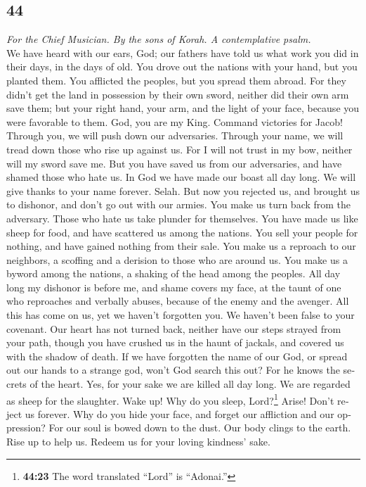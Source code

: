 \begin{paracol}{2}
\switchcolumn
\begin{otherlanguage}{english}

\hypertarget{section-87}{%
\section{44}\label{section-87}}

\emph{For the Chief Musician. By the sons of Korah. A contemplative
psalm.}\\
 We have heard with our ears, God; our fathers have told
us what work you did in their days, in the days of old. 
You drove out the nations with your hand, but you planted them. You
afflicted the peoples, but you spread them abroad.  For
they didn't get the land in possession by their own sword, neither did
their own arm save them; but your right hand, your arm, and the light of
your face, because you were favorable to them.  God, you
are my King. Command victories for Jacob!  Through you, we
will push down our adversaries. Through your name, we will tread down
those who rise up against us.  For I will not trust in my
bow, neither will my sword save me.  But you have saved us
from our adversaries, and have shamed those who hate us. 
In God we have made our boast all day long. We will give thanks to your
name forever. Selah.  But now you rejected us, and brought
us to dishonor, and don't go out with our armies.  You
make us turn back from the adversary. Those who hate us take plunder for
themselves.  You have made us like sheep for food, and
have scattered us among the nations.  You sell your
people for nothing, and have gained nothing from their sale.
 You make us a reproach to our neighbors, a scoffing and
a derision to those who are around us.  You make us a
byword among the nations, a shaking of the head among the peoples.
 All day long my dishonor is before me, and shame covers
my face,  at the taunt of one who reproaches and verbally
abuses, because of the enemy and the avenger.  All this
has come on us, yet we haven't forgotten you. We haven't been false to
your covenant.  Our heart has not turned back, neither
have our steps strayed from your path,  though you have
crushed us in the haunt of jackals, and covered us with the shadow of
death.  If we have forgotten the name of our God, or
spread out our hands to a strange god,  won't God search
this out? For he knows the secrets of the heart.  Yes,
for your sake we are killed all day long. We are regarded as sheep for
the slaughter.  Wake up! Why do you sleep,
Lord?\footnote{\textbf{44:23} The word translated ``Lord'' is
  ``Adonai.''} Arise! Don't reject us forever.  Why do
you hide your face, and forget our affliction and our oppression?
 For our soul is bowed down to the dust. Our body clings
to the earth.  Rise up to help us. Redeem us for your
loving kindness' sake.


\end{otherlanguage}
\end{paracol}
